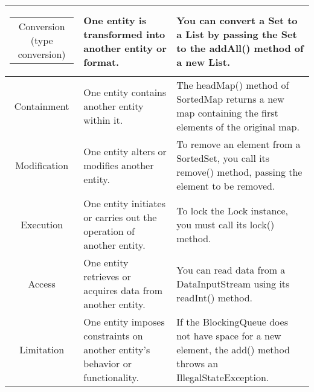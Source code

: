 \begin{table*}[h]
\begin{tabularx}{\textwidth}{@{}c|>{\centering\arraybackslash}X|>{\centering\arraybackslash}X@{}}
\begin{tabular}[c]{@{}c@{}}Conversion (type conversion)\end{tabular} & One entity is transformed into another entity or format. & You can convert a Set to a List by passing the Set to the addAll() method of a new List. \\ \hline
Containment & One entity contains another entity within it. & The headMap() method of SortedMap returns a new map containing the first elements of the original map. \\ \hline
Modification & One entity alters or modifies another entity. & To remove an element from a SortedSet, you call its remove() method, passing the element to be removed. \\ \hline
Execution & One entity initiates or carries out the operation of another entity. & To lock the Lock instance, you must call its lock() method. \\ \hline
Access & One entity retrieves or acquires data from another entity. & You can read data from a DataInputStream using its readInt() method. \\ \hline
Limitation & One entity imposes constraints on another entity's behavior or functionality. & If the BlockingQueue does not have space for a new element, the add() method throws an IllegalStateException. \\ \hline
\end{tabularx}
\label{tab: reldetail}
\end{table*}

\clearpage


